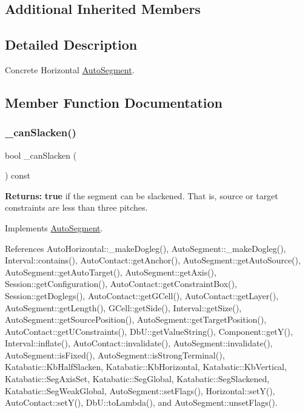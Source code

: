 \subsection*{Additional Inherited Members}


\subsection{Detailed Description}
Concrete Horizontal \hyperlink{classKatabatic_1_1AutoSegment}{Auto\+Segment}. 

\subsection{Member Function Documentation}
\mbox{\label{classKatabatic_1_1AutoHorizontal_a2ced98fb06f208aa88c0962a706e64db}} 
\subsubsection{\texorpdfstring{\+\_\+can\+Slacken()}{\_canSlacken()}}
{\footnotesize\ttfamily bool \+\_\+can\+Slacken (\begin{DoxyParamCaption}{ }\end{DoxyParamCaption}) const\hspace{0.3cm}{\ttfamily [virtual]}}

{\bfseries Returns\+:} {\bfseries true} if the segment can be slackened. That is, source or target constraints are less than three pitches. 

Implements \hyperlink{classKatabatic_1_1AutoSegment_a676fcb7ece71d129b7a4d87a3f2e07aa}{Auto\+Segment}.



References Auto\+Horizontal\+::\+\_\+make\+Dogleg(), Auto\+Segment\+::\+\_\+make\+Dogleg(), Interval\+::contains(), Auto\+Contact\+::get\+Anchor(), Auto\+Segment\+::get\+Auto\+Source(), Auto\+Segment\+::get\+Auto\+Target(), Auto\+Segment\+::get\+Axis(), Session\+::get\+Configuration(), Auto\+Contact\+::get\+Constraint\+Box(), Session\+::get\+Doglegs(), Auto\+Contact\+::get\+G\+Cell(), Auto\+Contact\+::get\+Layer(), Auto\+Segment\+::get\+Length(), G\+Cell\+::get\+Side(), Interval\+::get\+Size(), Auto\+Segment\+::get\+Source\+Position(), Auto\+Segment\+::get\+Target\+Position(), Auto\+Contact\+::get\+U\+Constraints(), Db\+U\+::get\+Value\+String(), Component\+::get\+Y(), Interval\+::inflate(), Auto\+Contact\+::invalidate(), Auto\+Segment\+::invalidate(), Auto\+Segment\+::is\+Fixed(), Auto\+Segment\+::is\+Strong\+Terminal(), Katabatic\+::\+Kb\+Half\+Slacken, Katabatic\+::\+Kb\+Horizontal, Katabatic\+::\+Kb\+Vertical, Katabatic\+::\+Seg\+Axis\+Set, Katabatic\+::\+Seg\+Global, Katabatic\+::\+Seg\+Slackened, Katabatic\+::\+Seg\+Weak\+Global, Auto\+Segment\+::set\+Flags(), Horizontal\+::set\+Y(), Auto\+Contact\+::set\+Y(), Db\+U\+::to\+Lambda(), and Auto\+Segment\+::unset\+Flags().

